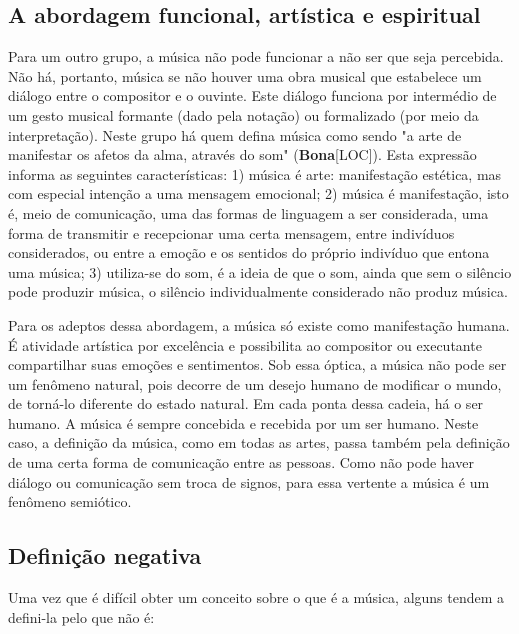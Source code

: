 \documentclass[a4paper,12pt]{article}
\begin{document}
\subsection*{A abordagem funcional, artística e espiritual}
Para um outro grupo, a música não pode funcionar a não ser que seja percebida. Não há, portanto, música se não houver uma obra musical que estabelece um diálogo entre o compositor e o ouvinte. Este diálogo funciona por intermédio de um gesto musical formante (dado pela notação) ou formalizado (por meio da interpretação). Neste grupo há quem defina música como sendo "a arte de manifestar os afetos da alma, através do som" (\textbf{Bona}\textsc{[LOC]}). Esta expressão informa as seguintes características: 1) música é arte: manifestação estética, mas com especial intenção a uma mensagem emocional; 2) música é manifestação, isto é, meio de comunicação, uma das formas de linguagem a ser considerada, uma forma de transmitir e recepcionar uma certa mensagem, entre indivíduos considerados, ou entre a emoção e os sentidos do próprio indivíduo que entona uma música; 3) utiliza-se do som, é a ideia de que o som, ainda que sem o silêncio pode produzir música, o silêncio individualmente considerado não produz música.

Para os adeptos dessa abordagem, a música só existe como manifestação humana. É atividade artística por excelência e possibilita ao compositor ou executante compartilhar suas emoções e sentimentos. Sob essa óptica, a música não pode ser um fenômeno natural, pois decorre de um desejo humano de modificar o mundo, de torná-lo diferente do estado natural. Em cada ponta dessa cadeia, há o ser humano. A música é sempre concebida e recebida por um ser humano. Neste caso, a definição da música, como em todas as artes, passa também pela definição de uma certa forma de comunicação entre as pessoas. Como não pode haver diálogo ou comunicação sem troca de signos, para essa vertente a música é um fenômeno semiótico.

\subsection*{Definição negativa}
Uma vez que é difícil obter um conceito sobre o que é a música, alguns tendem a defini-la pelo que não é:
\end{document}
